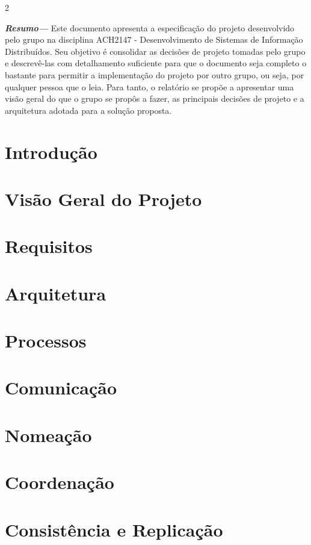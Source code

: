 \documentclass[a4paper]{article}
\begin{document}
\begin{multicols}{2}
\setlength{\columnsep}{0.5cm}

\noindent \textbf{\textit{Resumo---}} Este documento apresenta a especificação do projeto desenvolvido pelo grupo na disciplina ACH2147 - Desenvolvimento de Sistemas de Informação Distribuídos. Seu objetivo é consolidar as decisões de projeto tomadas pelo grupo e descrevê-las com detalhamento suficiente para que o documento seja completo o bastante para permitir a implementação do projeto por outro grupo, ou seja, por qualquer pessoa que o leia. Para tanto, o relatório se propõe a apresentar uma visão geral do que o grupo se propôs a fazer, as principais decisões de projeto e a arquitetura adotada para a solução proposta.

\section{Introdução}

\section{Visão Geral do Projeto}

\section{Requisitos}

\section{Arquitetura}

\section{Processos}

\section{Comunicação}

\section{Nomeação}

\section{Coordenação}

\section{Consistência e Replicação}


\end{multicols}
\end{document}
